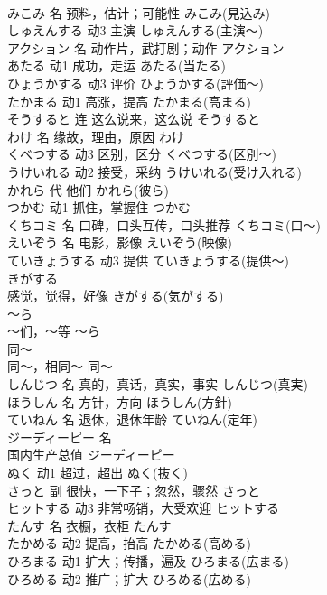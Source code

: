 \documentclass[8pt]{extreport}
\begin{document}
\begin{CJK}{UTF8}{min}
\\	みこみ	名	预料，估计；可能性	みこみ(見込み)	
\\	しゅえんする	动3	主演	しゅえんする(主演～)	
\\	アクション	名	动作片，武打剧；动作	アクション	
\\	あたる	动1	成功，走运	あたる(当たる)	
\\	ひょうかする	动3	评价	ひょうかする(評価～)	
\\	たかまる	动1	高涨，提高	たかまる(高まる)	
\\	そうすると	连	这么说来，这么说	そうすると	
\\	わけ	名	缘故，理由，原因	わけ	
\\	くべつする	动3	区别，区分	くべつする(区別～)	
\\	うけいれる	动2	接受，采纳	うけいれる(受け入れる)	
\\	かれら	代	他们	かれら(彼ら)	
\\	つかむ	动1	抓住，掌握住	つかむ	
\\	くちコミ	名	口碑，口头互传，口头推荐	くちコミ(口～)	
\\	えいぞう	名	电影，影像	えいぞう(映像)	
\\	ていきょうする	动3	提供	ていきょうする(提供～)	
\\	きがする	
\\	感觉，觉得，好像	きがする(気がする)	
\\	～ら	
\\	～们，～等	～ら	
\\	同～	
\\	同～，相同～	同～	
\\	しんじつ	名	真的，真话，真实，事实	しんじつ(真実)	
\\	ほうしん	名	方针，方向	ほうしん(方針)	
\\	ていねん	名	退休，退休年龄	ていねん(定年)	
\\	ジーディーピー	名	
\\	国内生产总值	ジーディーピー
\\	ぬく	动1	超过，超出	ぬく(抜く)	
\\	さっと	副	很快，一下子；忽然，骤然	さっと	
\\	ヒットする	动3	非常畅销，大受欢迎	ヒットする	
\\	たんす	名	衣橱，衣柜	たんす	
\\	たかめる	动2	提高，抬高	たかめる(高める)	
\\	ひろまる	动1	扩大；传播，遍及	ひろまる(広まる)	
\\	ひろめる	动2	推广；扩大	ひろめる(広める)	

\end{CJK}
\end{document}
